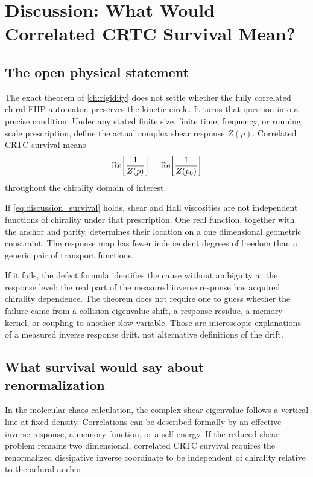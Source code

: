 \chapter{Discussion: What Would Correlated CRTC Survival Mean?}\label{ch:discussion}

\section{The open physical statement}
The exact theorem of \cref{ch:rigidity} does not settle whether the fully correlated chiral FHP automaton preserves the kinetic circle. It turns that question into a precise condition. Under any stated finite size, finite time, frequency, or running scale prescription, define the actual complex shear response $Z(p)$. Correlated CRTC survival means
\begin{equation}
 \operatorname{Re}\!\left[\frac1{Z(p)}\right]
 =\operatorname{Re}\!\left[\frac1{Z(p_0)}\right]
 \label{eq:discussion_survival}
\end{equation}
throughout the chirality domain of interest.

If \cref{eq:discussion_survival} holds, shear and Hall viscosities are not independent functions of chirality under that prescription. One real function, together with the anchor and parity, determines their location on a one dimensional geometric constraint. The response map has fewer independent degrees of freedom than a generic pair of transport functions.

If it fails, the defect formula identifies the cause without ambiguity at the response level: the real part of the measured inverse response has acquired chirality dependence. The theorem does not require one to guess whether the failure came from a collision eigenvalue shift, a response residue, a memory kernel, or coupling to another slow variable. Those are microscopic explanations of a measured inverse response drift, not alternative definitions of the drift.

\section{What survival would say about renormalization}
In the molecular chaos calculation, the complex shear eigenvalue follows a vertical line at fixed density. Correlations can be described formally by an effective inverse response, a memory function, or a self energy. If the reduced shear problem remains two dimensional, correlated CRTC survival requires the renormalized dissipative inverse coordinate to be independent of chirality relative to the achiral anchor.

